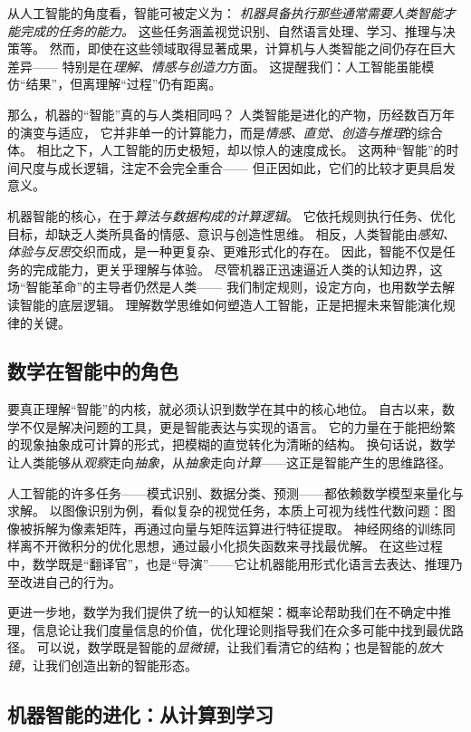 从人工智能的角度看，智能可被定义为：
\emph{机器具备执行那些通常需要人类智能才能完成的任务的能力。}
这些任务涵盖视觉识别、自然语言处理、学习、推理与决策等。
然而，即使在这些领域取得显著成果，计算机与人类智能之间仍存在巨大差异——
特别是在\emph{理解、情感与创造力}方面。
这提醒我们：人工智能虽能模仿“结果”，但离理解“过程”仍有距离。

那么，机器的“智能”真的与人类相同吗？
人类智能是进化的产物，历经数百万年的演变与适应，
它并非单一的计算能力，而是\emph{情感、直觉、创造与推理}的综合体。
相比之下，人工智能的历史极短，却以惊人的速度成长。
这两种“智能”的时间尺度与成长逻辑，注定不会完全重合——
但正因如此，它们的比较才更具启发意义。

机器智能的核心，在于\emph{算法与数据构成的计算逻辑}。
它依托规则执行任务、优化目标，却缺乏人类所具备的情感、意识与创造性思维。
相反，人类智能由\emph{感知、体验与反思}交织而成，是一种更复杂、更难形式化的存在。
因此，智能不仅是任务的完成能力，更关乎理解与体验。
尽管机器正迅速逼近人类的认知边界，这场“智能革命”的主导者仍然是人类——
我们制定规则，设定方向，也用数学去解读智能的底层逻辑。
理解数学思维如何塑造人工智能，正是把握未来智能演化规律的关键。

\subsection{数学在智能中的角色}
要真正理解“智能”的内核，就必须认识到数学在其中的核心地位。
自古以来，数学不仅是解决问题的工具，更是智能表达与实现的语言。
它的力量在于能把纷繁的现象抽象成可计算的形式，把模糊的直觉转化为清晰的结构。
换句话说，数学让人类能够从\emph{观察}走向\emph{抽象}，从\emph{抽象}走向\emph{计算}——这正是智能产生的思维路径。

人工智能的许多任务——模式识别、数据分类、预测——都依赖数学模型来量化与求解。
以图像识别为例，看似复杂的视觉任务，本质上可视为线性代数问题：图像被拆解为像素矩阵，再通过向量与矩阵运算进行特征提取。
神经网络的训练同样离不开微积分的优化思想，通过最小化损失函数来寻找最优解。
在这些过程中，数学既是“翻译官”，也是“导演”——它让机器能用形式化语言去表达、推理乃至改进自己的行为。

更进一步地，数学为我们提供了统一的认知框架：概率论帮助我们在不确定中推理，信息论让我们度量信息的价值，优化理论则指导我们在众多可能中找到最优路径。
可以说，数学既是智能的\emph{显微镜}，让我们看清它的结构；也是智能的\emph{放大镜}，让我们创造出新的智能形态。

\subsection{机器智能的进化：从计算到学习}

